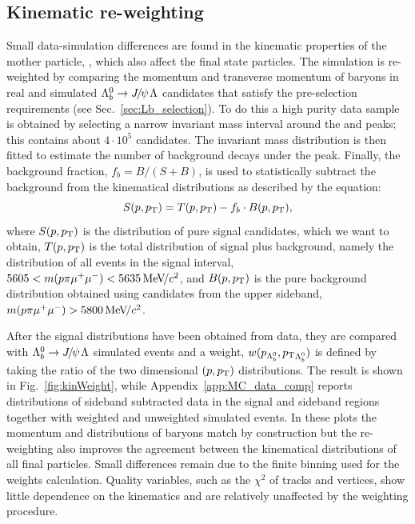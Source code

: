 \subsection{Kinematic re-weighting}
\label{sec:kinWeight}

Small data-simulation differences are found in the kinematic properties of the mother particle, \Lb,
which also affect the final state particles. The simulation is re-weighted by 
comparing the momentum and transverse momentum of \Lb baryons in 
real and simulated $\Lb\to\jpsi\Lz$ candidates that satisfy the pre-selection requirements (see Sec.~\ref{sec:Lb_selection}).
To do this a high purity data sample is obtained by selecting a narrow invariant mass interval around the \jpsi 
and \Lb peaks; this contains about $4\cdot10^5$ candidates.
The \Lb invariant mass distribution is then fitted to estimate the number of background decays under the peak.
Finally, the background fraction, \mbox{$f_b = B/(S+B)$}, is used to statistically subtract 
the background from the kinematical distributions as described by the equation:
%
\begin{equation}
S(p,\mbox{$p_{\rm T}$}) = T(p,\mbox{$p_{\rm T}$}) - f_b\cdot B(p,\mbox{$p_{\rm T}$}),
\end{equation}
\noindent
where $S(p,\mbox{$p_{\rm T}$})$ is the distribution of pure signal candidates, which we want to obtain, $T(p,\mbox{$p_{\rm T}$})$ is the total
distribution of signal plus background, namely the distribution of all events in the signal interval,
$5605 < m(p\pi\mumu) < 5635 \mevcc$, and $B(p,\mbox{$p_{\rm T}$})$ is the pure background
distribution obtained using candidates from the upper sideband, $m(p\pi\mumu) > 5800 \mevcc$.

After the signal distributions have been obtained from data, they are compared with \mbox{$\Lb\to\jpsi\Lz$} simulated events
and a weight, $w(p_{{{\Lambda}^0_{b}}},\mbox{$p_{\rm T}$}_{{{\Lambda}^0_{b}}})$ is defined by taking the ratio of the two dimensional $(p,\mbox{$p_{\rm T}$})$ distributions.
The result is shown in Fig.~\ref{fig:kinWeight}, while Appendix~\ref{app:MC_data_comp} reports distributions
of sideband subtracted data in the signal and sideband regions together with weighted and unweighted simulated events.
In these plots the momentum and \pt distributions of \Lb baryons match by construction but the re-weighting also improves the agreement 
between the kinematical distributions of all final particles. Small differences remain due to
the finite binning used for the weights calculation. Quality variables, such as the $\chi^2$ of tracks
and vertices, show little dependence on the kinematics and are relatively unaffected by the weighting procedure.


